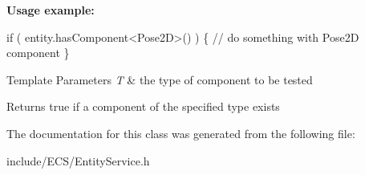 {\bfseries Usage example\+:} 
\begin{DoxyCode}
\textcolor{keywordflow}{if} ( entity.hasComponent<Pose2D>() ) \{
    \textcolor{comment}{// do something with Pose2D component}
\}
\end{DoxyCode}



\begin{DoxyTemplParams}{Template Parameters}
{\em T} & the type of component to be tested \\
\hline
\end{DoxyTemplParams}
\begin{DoxyReturn}{Returns}
{\ttfamily true} if a component of the specified type exists 
\end{DoxyReturn}


The documentation for this class was generated from the following file\+:\begin{DoxyCompactItemize}
\item 
include/\+E\+C\+S/Entity\+Service.\+h\end{DoxyCompactItemize}
